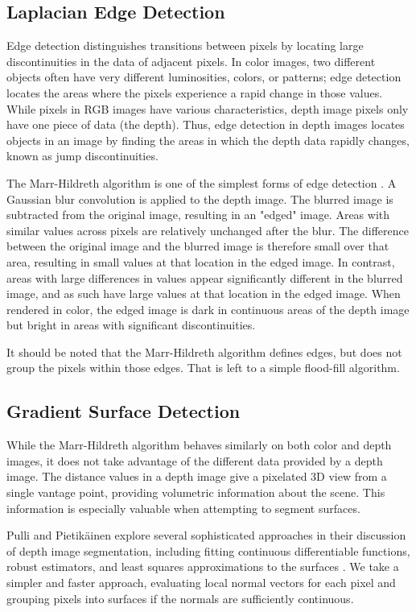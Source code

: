 \subsection{Laplacian Edge Detection}
\label{subsec:laplacian}
Edge detection distinguishes transitions between pixels by locating large discontinuities in the data of adjacent pixels. In color images, two different
objects often have very different luminosities, colors, or
patterns; edge detection locates the areas where the pixels
experience a rapid change in those values. While pixels in RGB images
have various characteristics, depth image pixels only have one
piece of data (the depth). Thus, edge detection in depth images
locates objects in an image by finding the areas in which the depth
data rapidly changes, known as jump discontinuities. 

The Marr-Hildreth algorithm is one of the simplest forms of edge detection \cite{marr}. A Gaussian blur convolution is applied to the depth image. The blurred image is subtracted from the original image, resulting
in an "edged" image. Areas with similar values across pixels are
relatively unchanged after the blur.   The difference between the original image and the blurred image is therefore small over that area, resulting in small values at that location in the edged image. In contrast, areas with large
differences in values appear significantly different in the blurred image, and as such have large values at that location in the edged image. When rendered in color, the edged image is dark in continuous areas of the depth image but bright in areas with significant discontinuities. 

It should be noted that the Marr-Hildreth algorithm defines edges, but does not group the pixels within those edges.  That is left to a simple flood-fill algorithm.

\subsection{Gradient Surface Detection}
\label{subsec:gradient}
While the Marr-Hildreth algorithm behaves similarly on both color and depth images, it does not take advantage of the different data provided by a depth image.  The distance values in a depth image give a pixelated 3D view from a single vantage point, providing volumetric information about the scene.  This information is especially valuable when attempting to segment surfaces.

Pulli and Pietik{\"a}inen explore several sophisticated approaches in their discussion of depth image segmentation, including fitting continuous differentiable functions, robust estimators, and least squares approximations to the surfaces \cite{pulli}.  We take a simpler and faster approach, evaluating local normal vectors for each pixel and grouping pixels into surfaces if the normals are sufficiently continuous.  

